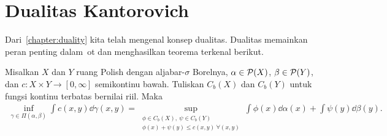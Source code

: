 \section{Dualitas Kantorovich}
Dari~\cref{chapter:duality} kita telah mengenal konsep dualitas. Dualitas memainkan peran penting dalam~\gls{ot} dan menghasilkan teorema terkenal berikut.
\begin{theorem}
    Misalkan $X$ dan $Y$ ruang Polish dengan aljabar-$\sigma$ Borelnya, $\alpha\in\mathcal{P}(X)$, $\beta\in\mathcal{P}(Y)$, dan $c:X\times Y\rightarrow[0,\infty]$ semikontinu bawah. Tuliskan $C_b(X)$ dan $C_b(Y)$ untuk fungsi kontinu terbatas bernilai riil. Maka
    \begin{equation}
        \begin{aligned}
            \inf_{\gamma\in\Pi(\alpha,\beta)}\int c(x,y)\dd\gamma(x,y)
            = \sup_{\substack{\phi\in C_b(X),\ \psi\in C_b(Y)\\
            \phi(x)+\psi(y)\leq c(x,y)\ \forall(x,y)}}
            \int\phi(x)\dd\alpha(x)+\int\psi(y)\dd\beta(y).
        \end{aligned}
    \end{equation}
\end{theorem}

